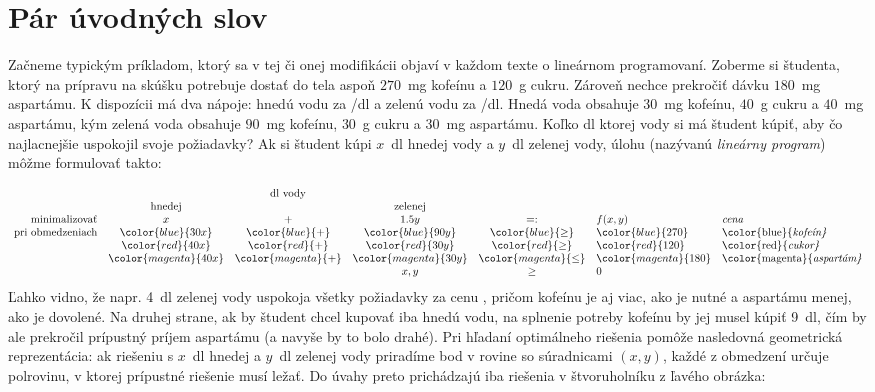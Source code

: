 \section{Pár úvodných slov}

Začneme typickým príkladom, ktorý sa v tej či onej modifikácii objaví v každom
texte o lineárnom programovaní.  Zoberme si študenta, ktorý na prípravu na
skúšku potrebuje dostať do tela aspoň $270$~mg kofeínu a $120$~g cukru.
Zároveň nechce prekročiť dávku $180$~mg aspartámu. K dispozícii má dva nápoje:
hnedú vodu za \hbox{/dl} a zelenú vodu za \hbox{/dl.}
Hnedá voda obsahuje $30$~mg kofeínu, $40$~g cukru a $40$~mg aspartámu, kým
zelená voda obsahuje $90$~mg kofeínu, $30$~g cukru a $30$~mg aspartámu. Koľko dl
ktorej vody si má študent kúpiť, aby čo najlacnejšie uspokojil svoje
požiadavky? Ak si študent kúpi $x$~dl hnedej vody a $y$~dl zelenej vody, úlohu
(nazývanú {\em lineárny program}) môžme formulovať takto:

\begin{equation}
  \label{eq:LP:1}
\begin{array}{rccccll}
                          & \multicolumn{3}{c}{\text{dl vody}} \\ 
                          & \text{hnedej} & & \text{zelenej}\\
  \text{minimalizovať}     & x   & + & 1.5 y & =: & f(x,y) &  \text{\em cena}\\
   {\rm pri\ obmedzeniach} & \color{blue}{30 x } & \color{blue}{+} & \color{blue}{90 y} & \color{blue}{\ge} & \color{blue}{270} & \text{\color{blue}{\em kofeín}}\\ 
                           & \color{red}{40 x}   & \color{red}{+}  & \color{red}{30 y}  & \color{red}{\ge} & \color{red}{120} & \text{\color{red}{\em cukor}} \\
                           & \color{magenta}{40 x} & \color{magenta}{+} & \color{magenta}{30 y} & \color{magenta}{\le} & \color{magenta}{180} & \text{\color{magenta}{\em aspartám}}\\
                          &      &   & x,y  &\ge& 0
\end{array}
\end{equation}
%
Ľahko vidno, že napr. 4~dl zelenej vody uspokoja všetky požiadavky za cenu
, pričom kofeínu je aj viac, ako je nutné a aspartámu menej, ako je
dovolené. Na druhej strane, ak by študent chcel kupovať iba hnedú vodu, na
splnenie potreby kofeínu by jej musel kúpiť 9~dl, čím by ale prekročil
prípustný príjem aspartámu (a navyše by to bolo drahé). Pri hľadaní optimálneho
riešenia pomôže nasledovná geometrická reprezentácia: ak riešeniu s $x$~dl
hnedej a $y$~dl zelenej vody priradíme bod v rovine so súradnicami $(x,y)$,
každé z obmedzení určuje polrovinu, v ktorej prípustné riešenie musí ležať.
Do úvahy preto prichádzajú iba riešenia v štvoruholníku z ľavého obrázka:


